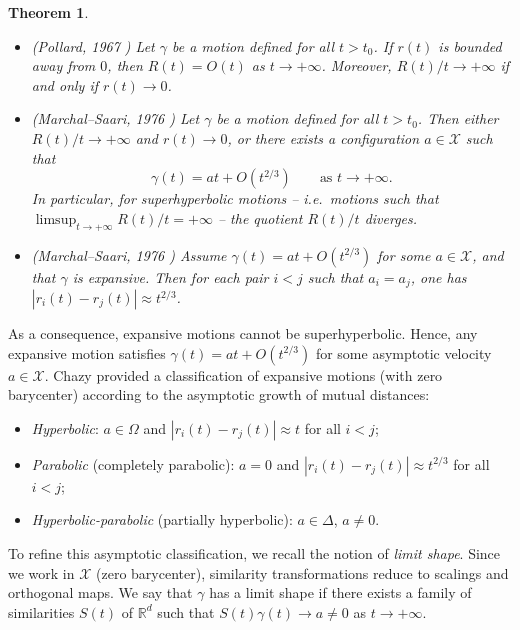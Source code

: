 \documentclass[a4paper,10pt]{amsart}
\theoremstyle{plain}
\newtheorem{thm}{Theorem}
\theoremstyle{definition}
\numberwithin{equation}{section}
\numberwithin{thm}{section}
\begin{document}
\begin{thm}\label{PollardTheorem}
\begin{itemize}
\item[$(i)$] (Pollard, 1967 \cite{Pollard_BehaviorOfGravitationalSystems})
Let $\gamma$ be a motion defined for all $t>t_0$. If $r(t)$ is bounded away from $0$, then $R(t)=O(t)$ as $t\to+\infty$. Moreover, $R(t)/t\to+\infty$ if and only if $r(t)\to 0$.

\item[$(ii)$] (Marchal--Saari, 1976 \cite{MarchalSaari_FinalEvolution})
Let $\gamma$ be a motion defined for all $t>t_0$. Then either $R(t)/t\to+\infty$ and $r(t)\to 0$, or there exists a configuration $a\in\mathcal{X}$ such that
\[
\gamma(t)=at+O(t^{2/3})
\qquad\text{as }t\to+\infty.
\]
In particular, for \emph{superhyperbolic} motions -- i.e.\ motions such that $\limsup_{t\to+\infty}R(t)/t=+\infty$ -- the quotient $R(t)/t$ diverges.

\item[$(iii)$] (Marchal--Saari, 1976 \cite{MarchalSaari_FinalEvolution})
Assume $\gamma(t)=at+O(t^{2/3})$ for some $a\in\mathcal{X}$, and that $\gamma$ is expansive. Then for each pair $i<j$ such that $a_i=a_j$, one has $|r_i(t)-r_j(t)|\approx t^{2/3}$.
\end{itemize}
\end{thm}

As a consequence, expansive motions cannot be superhyperbolic. Hence, any expansive motion satisfies $\gamma(t)=at+O(t^{2/3})$ for some asymptotic velocity $a\in\mathcal{X}$. Chazy \cite{Chazy} provided a classification of expansive motions (with zero barycenter) according to the asymptotic growth of mutual distances:
\begin{itemize}
\item[$(H)$] \emph{Hyperbolic}: $a\in\Omega$ and $|r_i(t)-r_j(t)|\approx t$ for all $i<j$;
\item[$(P)$] \emph{Parabolic} (completely parabolic): $a=0$ and $|r_i(t)-r_j(t)|\approx t^{2/3}$ for all $i<j$;
\item[$(HP)$] \emph{Hyperbolic-parabolic} (partially hyperbolic): $a\in\Delta$, $a\neq 0$.
\end{itemize}

To refine this asymptotic classification, we recall the notion of \emph{limit shape}. Since we work in $\mathcal{X}$ (zero barycenter), similarity transformations reduce to scalings and orthogonal maps. We say that $\gamma$ has a limit shape if there exists a family of similarities $S(t)$ of $\mathbb{R}^d$ such that $S(t)\gamma(t)\to a\neq 0$ as $t\to+\infty$.
\end{document}
